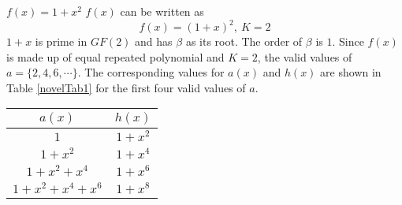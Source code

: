 \begin{example}
$f(x)=1+x^2$\newline
$f(x)$ can be written as $$f(x)=(1+x)^2,~K=2$$ $1+x$ is prime in $GF(2)$ and has $\beta$ as its root. The order of $\beta$ is $1$. Since $f(x)$ is made up of equal repeated polynomial and $K=2$, the valid values of $a=\{2,4,6,\cdots \}$.
The corresponding values for $a(x)$ and $h(x)$ are shown in Table \ref{novelTab1} for the first four valid values of $a$.
\begin{table*}[h!]
 \caption{$f(x)=1+x^2$}
 \centering
\begin{tabular}{c c } 
\hline
 $a(x)$ & $h(x)$ \\ [0.5ex] 
\hline\hline
$1$ & $1+x^2$\\ 
$1+x^2$ & $1+x^4$ \\
$1+x^2+x^4$ & $1+x^6$\\
$1+x^2+x^4+x^6$ & $1+x^8$ 
\end{tabular}
 \label{novelTab1}
\end{table*}
\end{example}





